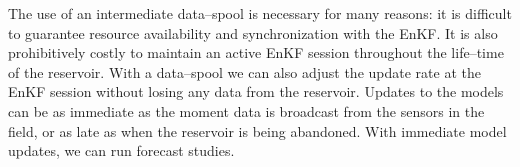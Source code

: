 \documentclass{rspublic}
\newcommand{\up}{\vspace*{-0.3em}}
\begin{document}
The use of an intermediate data--spool is necessary for many reasons: it is difficult to guarantee resource availability and synchronization with the EnKF. It is also prohibitively costly to maintain an active EnKF session throughout the life--time of the reservoir. With a data--spool we can also adjust the update rate at the EnKF session without losing any data from the reservoir. Updates to the models can be as immediate as the moment data is broadcast from the sensors in the field, or as late as when the reservoir is being abandoned. With immediate model updates, we can run forecast studies.



\end{document}
